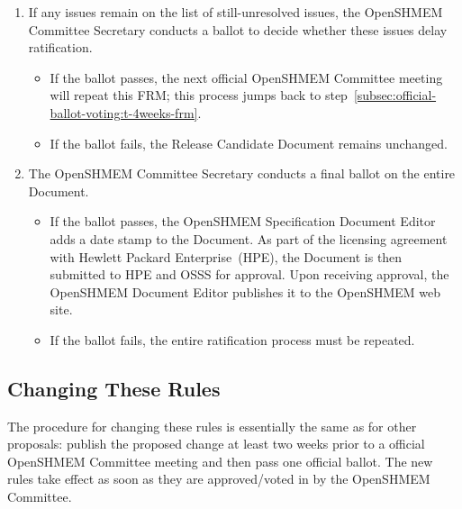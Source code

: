 \begin{enumerate}
\begin{enumerate}
    \item If any issues remain on the list of still-unresolved issues,
      the OpenSHMEM Committee Secretary conducts a ballot to decide whether
      these issues delay ratification.
      \begin{itemize}
      \item If the ballot passes, the next official OpenSHMEM Committee meeting
        will repeat this FRM; this process jumps back to
        step~\ref{subsec:official-ballot-voting:t-4weeks-frm}.
      \item If the ballot fails, the Release Candidate Document
        remains unchanged.
      \end{itemize}
    \item The OpenSHMEM Committee Secretary conducts a final ballot on the
      entire Document.
      \begin{itemize}
      \item If the ballot passes, the OpenSHMEM Specification Document Editor adds
        a date stamp to the Document.
        As part of the licensing agreement with Hewlett Packard
        Enterprise~(HPE), the Document is then submitted to HPE and OSSS for
        approval.  Upon receiving approval, the OpenSHMEM Document Editor
        publishes it to the OpenSHMEM web site.
      \item If the ballot fails, the entire ratification process must be
        repeated.
      \end{itemize}
  \end{enumerate}
\end{enumerate}


\subsection{Changing These Rules}

The procedure for changing these rules is essentially the same as for
other proposals: publish the proposed change at least two weeks prior
to a official OpenSHMEM Committee meeting and then pass one official ballot.
The new rules take effect as soon as they are approved/voted in by the
OpenSHMEM Committee.

